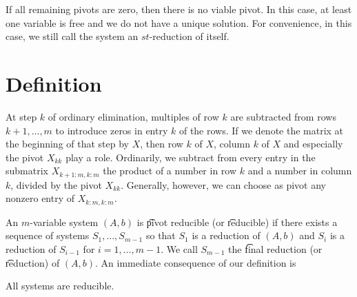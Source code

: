 If all remaining pivots are zero, then there is no viable pivot.
In this case, at least one variable is free and we do not have a unique solution.
For convenience, in this case, we still call the system an $st$-reduction of itself.


\section*{Definition}

At step $k$ of ordinary elimination, multiples of row $k$ are subtracted from rows $k+1, \dots , m$ to introduce zeros in entry $k$ of the rows.
If we denote the matrix at the beginning of that step by $X$, then row $k$ of $X$, column $k$ of $X$ and especially the pivot $X_{kk}$ play a role.
Ordinarily, we subtract from every entry in the submatrix $X_{k+1:m,k:m}$ the product of a number in row $k$ and a number in column $k$, divided by the pivot $X_{kk}$.
Generally, however, we can choose as pivot any nonzero entry of $X_{k:m,k:m}$.

An $m$-variable system $(A, b)$ is \t{pivot reducible} (or \t{reducible}) if there exists a sequence of systems $S_1, \dots , S_{m-1}$ so that $S_1$ is a reduction of $(A, b)$ and $S_{i}$ is a reduction of $S_{i-1}$ for $i = 1, \dots , m-1$.
We call $S_{m-1}$ the \t{final reduction} (or \t{reduction}) of $(A, b)$.
An immediate consequence of our definition is

\begin{proposition}
All systems are reducible.\end{proposition}